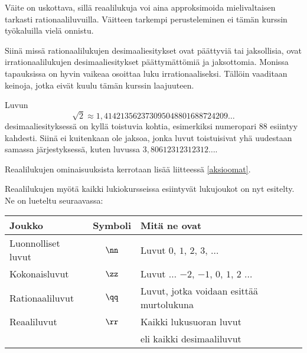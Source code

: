 
Väite on uskottava, sillä reaalilukuja voi aina approksimoida mielivaltaisen tarkasti rationaaliluvuilla. Väitteen tarkempi perusteleminen ei tämän kurssin työkaluilla vielä onnistu.

Siinä missä rationaalilukujen desimaaliesitykset ovat päättyviä tai jaksollisia, ovat irrationaalilukujen desimaaliesitykset päättymättömiä ja
jaksottomia. Monissa tapauksissa on hyvin vaikeaa osoittaa luku irrationaaliseksi. Tällöin vaaditaan keinoja, jotka eivät kuulu tämän kurssin laajuuteen.

Luvun
\[\sqrt{2} \approx 1,414213562373095048801688724209\ldots\]
desimaaliesityksessä on kyllä toistuvia kohtia, esimerkiksi numeropari $88$ esiintyy kahdesti. Siinä ei kuitenkaan ole jaksoa, jonka luvut toistuisivat yhä uudestaan
samassa järjestyksessä, kuten luvussa $3,80612312312312\ldots$.

Reaalilukujen ominaisuuksista kerrotaan lisää liitteessä \ref{aksioomat}.


Reaalilukujen myötä kaikki lukiokursseissa esiintyvät lukujoukot on nyt esitelty. Ne on lueteltu seuraavassa:
\begin{center}\begin{tabular}{l|c|l}
Joukko & Symboli & Mitä ne ovat\\
\hline
Luonnolliset luvut & $\nn$ &
Luvut $0$, $1$, $2$, $3$, $\ldots$ \\
Kokonaisluvut & $\zz$ & Luvut $\ldots$ $-2$, $-1$, $0$, $1$, $2$ $\ldots$ \\ 
Rationaaliluvut & $\qq$ & Luvut, jotka voidaan esittää
murtolukuna \\
Reaaliluvut & $\rr$ & Kaikki lukusuoran luvut \\
& & eli kaikki desimaaliluvut
\end{tabular} \end{center} 

